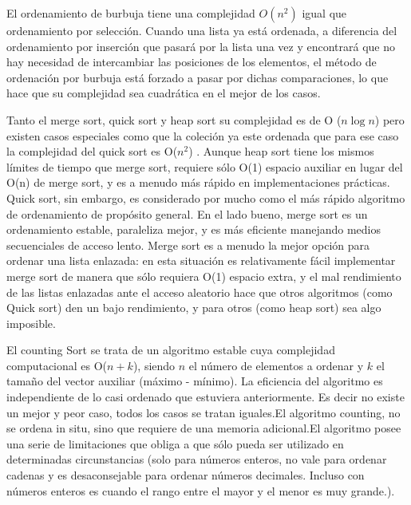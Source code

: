 El ordenamiento de burbuja tiene una complejidad $O(n^{2})$ igual que ordenamiento por selección. Cuando una lista ya está ordenada, a diferencia del ordenamiento por inserción que pasará por la lista una vez y encontrará que no hay necesidad de intercambiar las posiciones de los elementos, el método de ordenación por burbuja está forzado a pasar por dichas comparaciones, lo que hace que su complejidad sea cuadrática en el mejor de los casos.

Tanto el merge sort, quick sort y heap sort su complejidad es de O ($n\log{n}$) pero existen casos especiales como que la coleción ya este ordenada que para ese caso la complejidad del quick sort es O($n^2$) . Aunque heap sort tiene los mismos límites de tiempo que merge sort, requiere sólo O(1) espacio auxiliar en lugar del O(n) de merge sort, y es a menudo más rápido en implementaciones prácticas.  Quick sort, sin embargo, es considerado por mucho como el más rápido algoritmo de ordenamiento de propósito general. En el lado bueno, merge sort es un ordenamiento estable, paraleliza mejor, y es más eficiente manejando medios secuenciales de acceso lento. Merge sort es a menudo la mejor opción para ordenar una lista enlazada: en esta situación es relativamente fácil implementar merge sort de manera que sólo requiera O(1) espacio extra, y el mal rendimiento de las listas enlazadas 
ante el acceso aleatorio hace que otros algoritmos (como Quick sort) den un bajo rendimiento, y para otros (como heap sort) sea algo imposible.

El counting Sort se trata de un algoritmo estable cuya complejidad computacional es O($n+k$), siendo $n$ el número de elementos a ordenar y $k$ el tamaño del vector auxiliar (máximo - mínimo). La eficiencia del algoritmo es independiente de lo casi ordenado que estuviera anteriormente. Es decir no existe un mejor y peor caso, todos los casos se tratan iguales.El algoritmo counting, no se ordena in situ, sino que requiere de una memoria adicional.El algoritmo posee una serie de limitaciones que obliga a que sólo pueda ser utilizado en determinadas circunstancias (solo para números enteros, no vale para ordenar cadenas y es desaconsejable para ordenar números decimales. Incluso con números enteros es cuando el rango entre el mayor y el menor es muy grande.).